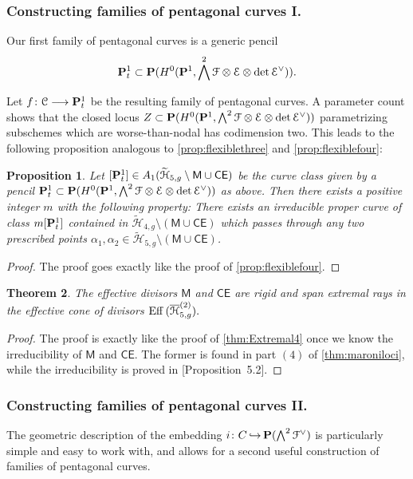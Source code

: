 \documentclass[reqno, 10 pt]{article}
\newtheorem{thm}{Theorem}
\newtheorem{prop}[thm]{Proposition}
\theoremstyle{definition}
\theoremstyle{remark}
\numberwithin{equation}{section}
\numberwithin{thm}{section}
\numberwithin{prop}{section}
\numberwithin{lem}{section}
\numberwithin{cor}{section}
\numberwithin{conj}{section}
\numberwithin{defn}{section}
\renewcommand{\H}{\mathcal H}
\newcommand{\td}{\widetilde}
\renewcommand{\to}{\longrightarrow}
\newcommand{\sfCE}{{\mathsf {CE}}}
\newcommand{\sfM}{{\mathsf M}}
\newcommand{\cC}{{\mathcal C}}
\newcommand{\cE}{{\mathcal E}}
\newcommand{\cF}{{\mathcal F}}
\renewcommand{\P}{{\bf P}}
\newcommand {\from}{{\colon}}
\newcommand{\into}{\,{\hookrightarrow}\,}
\renewcommand{\H}{{\mathcal{H}}}
\newcommand {\Eff}{{\rm Eff}\,}
\begin{document}
\subsubsection{Constructing families of pentagonal curves I.}  

Our first  family of pentagonal curves is a generic pencil $$\P^{1}_{t} \subset \P(H^{0}(\P^{1}, \bigwedge^{2}\cF \otimes \cE \otimes \det \dual{\cE})).$$ 

Let $f \from \cC \to \P^{1}_{t}$ be the resulting family of pentagonal curves.  A parameter count shows that the closed locus $Z \subset \P(H^{0}(\P^{1}, \bigwedge^{2}\cF \otimes \cE \otimes \det \dual{\cE}))$  parametrizing subschemes which are worse-than-nodal has codimension two.  This leads to the following proposition analogous to \autoref{prop:flexiblethree} and \autoref{prop:flexiblefour}:

\begin{prop}\label{prop:flexiblefive}
Let $[\P^{1}_{t}] \in A_{1}(\td{\H}_{5,g} \setminus \sfM \cup \sfCE)$ be the curve class given by a pencil $\P^{1}_{t} \subset \P(H^{0}(\P^{1}, \bigwedge^{2}\cF \otimes \cE \otimes \det \dual{\cE}))$ as above. Then there exists a positive integer $m$ with the following property: There exists an irreducible proper curve of class $m[\P^{1}_{t}]$ contained in $\td{\H}_{4,g} \setminus (\sfM \cup \sfCE)$ which passes through any two prescribed points $\alpha_{1}, \alpha_{2} \in \td{\H}_{5,g} \setminus (\sfM \cup \sfCE)$.  
\end{prop} 

\begin{proof} The proof goes exactly like the proof of \autoref{prop:flexiblefour}.
\end{proof}

\begin{thm}\label{thm:Extremal5}
The effective divisors $\sfM$ and $\sfCE$ are rigid and span extremal rays in the effective cone of divisors $\Eff (\overline{\H}^{(2)}_{5,g}).$
\end{thm}

\begin{proof}
The proof is exactly like the proof of \autoref{thm:Extremal4} once we know the irreducibility of $\sfM$ and $\sfCE$. The former is found in part $(4)$ of \autoref{thm:maroniloci}, while the irreducibility is proved in \cite{dp:pic_345}[Proposition~5.2].
\end{proof}

\subsubsection{Constructing families of pentagonal curves II.}\label{pentagonalconstruction}
The geometric description of the embedding $i \from C \into \P(\bigwedge^{2}\dual{\cF})$ is particularly simple and easy to work with, and allows for a second useful construction of families of pentagonal curves.  
\end{document}
